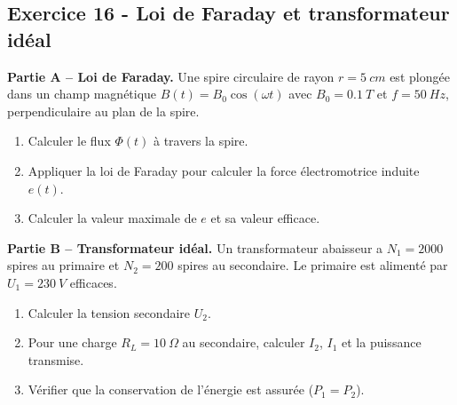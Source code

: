 \documentclass[12pt,a4paper]{article}
\begin{document}
\subsection*{Exercice 16 - Loi de Faraday et transformateur idéal \niveau{\moyen}}

\begin{boiteexercice}
\textbf{Partie A -- Loi de Faraday.} Une spire circulaire de rayon $r=\qty{5}{cm}$ est plongée dans un champ magnétique $B(t)=B_0\cos(\omega t)$ avec $B_0=\qty{0.1}{T}$ et $f=\qty{50}{Hz}$, perpendiculaire au plan de la spire.
\begin{enumerate}
  \item Calculer le flux $\Phi(t)$ à travers la spire.
  \item Appliquer la loi de Faraday pour calculer la force électromotrice induite $e(t)$.
  \item Calculer la valeur maximale de $e$ et sa valeur efficace.
\end{enumerate}
\textbf{Partie B -- Transformateur idéal.} Un transformateur abaisseur a $N_1=2000$ spires au primaire et $N_2=200$ spires au secondaire. Le primaire est alimenté par $U_1=\qty{230}{V}$ efficaces.
\begin{enumerate}[resume]
  \item Calculer la tension secondaire $U_2$.
  \item Pour une charge $R_L=\qty{10}{\Omega}$ au secondaire, calculer $I_2$, $I_1$ et la puissance transmise.
  \item Vérifier que la conservation de l'énergie est assurée ($P_1=P_2$).
\end{enumerate}
\end{boiteexercice}
\end{document}
